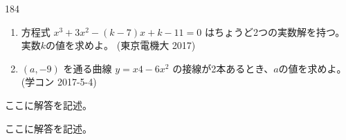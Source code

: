 \begin{prob}{184}{}{}
 \begin{enumerate}
  \item 方程式 $x^3+3x^2-(k-7)x+k-11=0$ はちょうど2つの実数解を持つ。実数$k$の値を求めよ。  (東京電機大 2017)
  \item $(a,-9)$ を通る曲線 $y=x4-6x^2$ の接線が2本あるとき、$a$の値を求めよ。  (学コン 2017-5-4)
 \end{enumerate}
\end{prob}
ここに解答を記述。

ここに解答を記述。